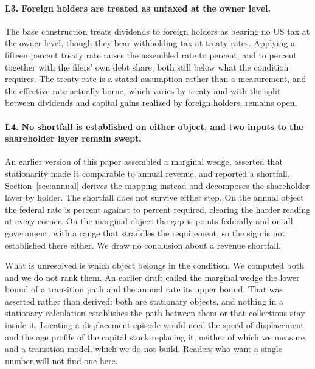\paragraph{L3. Foreign holders are treated as untaxed at the owner level.} The base construction
treats dividends to foreign holders as bearing no US tax at the owner level, though they bear
withholding tax at treaty rates. Applying a fifteen percent treaty rate raises the assembled rate
to  percent, and to  percent together with the
filers' own debt share, both still below what the condition requires. The treaty rate is a stated
assumption rather than a measurement, and the effective rate actually borne, which varies by
treaty and with the split between dividends and capital gains realized by foreign holders,
remains open.

\paragraph{L4. No shortfall is established on either object, and two inputs to the
shareholder layer remain swept.} An earlier version of this paper assembled a
marginal wedge, asserted that stationarity made it comparable to annual revenue, and reported a
shortfall. Section~\ref{sec:annual} derives the mapping instead and decomposes the shareholder
layer by holder. The shortfall does not survive either step. On the annual object the federal
rate is  percent against  to
 percent required, clearing the harder reading at every corner. On the
marginal object the gap is  points federally and  on all
government, with a range that straddles the requirement, so the sign is not established there
either. We draw no conclusion about a revenue shortfall.

What is unresolved is which object belongs in the condition. We computed both and we do not rank them.
An earlier draft called the marginal wedge the lower bound of a transition path and the annual
rate its upper bound. That was asserted rather than derived: both are stationary objects, and
nothing in a stationary calculation establishes the path between them or that collections stay
inside it. Locating a displacement episode would need the speed of displacement and the age
profile of the capital stock replacing it, neither of which we measure, and a transition model,
which we do not build. Readers who want a single number will not find one
here.

